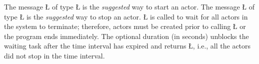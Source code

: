 \documentclass[openright,twoside]{report}
\begin{document}
The message \LGinlinetrue\LGbegin\lgrinde\L{}\endlgrinde\LGend{} of type \LGinlinetrue\LGbegin\lgrinde\L{}\endlgrinde\LGend{} is the \emph{suggested} way to start an actor.
The message \LGinlinetrue\LGbegin\lgrinde\L{}\endlgrinde\LGend{} of type \LGinlinetrue\LGbegin\lgrinde\L{}\endlgrinde\LGend{} is the \emph{suggested} way to stop an actor.
\LGinlinetrue\LGbegin\lgrinde\L{}\endlgrinde\LGend{} is called to wait for all actors in the system to terminate;
therefore, actors must be created prior to calling \LGinlinetrue\LGbegin\lgrinde\L{}\endlgrinde\LGend{} or the program ends immediately.
The optional duration (in seconds) unblocks the waiting task after the time interval has expired and returns \LGinlinetrue\LGbegin\lgrinde\L{}\endlgrinde\LGend{}, i.e., all the actors did not stop in the time interval.
\end{document}
